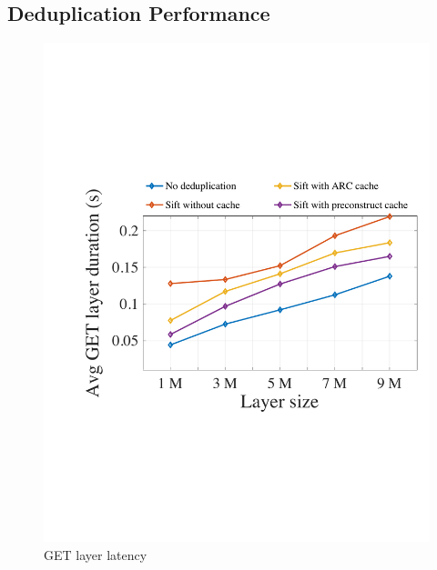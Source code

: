 

\subsection{Deduplication Performance}
\label{sec:eval-dedup}


\begin{figure}[t]
	\centering
	\begin{minipage}{0.28\textwidth}
		\centering
		\includegraphics[width=\textwidth]{graphs/1nodegetlayerlatency.pdf}
		\caption{GET layer latency}
		\label{fig:eval-1nodegetlayerlatency}
	\end{minipage}%
\hfill
	\begin{minipage}{0.28\textwidth}
		\centering

\end{minipage}
\end{figure}
